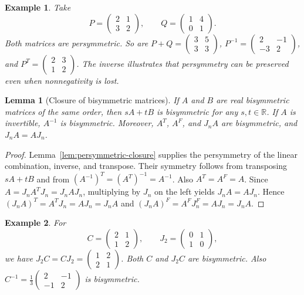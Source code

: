 \documentclass[11pt,a4paper]{article}
\newtheorem{example}{Example}
\newtheorem{lemma}{Lemma}
\begin{document}
\begin{example}
Take
\[
 P=\begin{pmatrix}2&1\\3&2\end{pmatrix},\qquad
 Q=\begin{pmatrix}1&4\\0&1\end{pmatrix}.
\]
Both matrices are persymmetric. So are
$P+Q=\left(\begin{smallmatrix}3&5\\3&3\end{smallmatrix}\right)$,
$P^{-1}=\left(\begin{smallmatrix}2&-1\\-3&2\end{smallmatrix}\right)$,
and $P^T=\left(\begin{smallmatrix}2&3\\1&2\end{smallmatrix}\right)$.
The inverse illustrates that persymmetry can be preserved even when
nonnegativity is lost.
\end{example}

\begin{lemma}[Closure of bisymmetric matrices]\label{lem:bisymmetric-closure}
If $A$ and $B$ are real bisymmetric matrices of the same order, then
$sA+tB$ is bisymmetric for any $s,t\in\mathbb R$. If $A$ is invertible,
$A^{-1}$ is bisymmetric. Moreover, $A^T$, $A^F$, and $J_nA$ are
bisymmetric, and $J_nA=AJ_n$.
\end{lemma}
\begin{proof}
Lemma~\ref{lem:persymmetric-closure} supplies the persymmetry of the
linear combination, inverse, and transpose. Their symmetry follows from
transposing $sA+tB$ and from $(A^{-1})^T=(A^T)^{-1}=A^{-1}$.
Also $A^T=A^F=A$. Since $A=J_nA^TJ_n=J_nAJ_n$, multiplying by $J_n$
on the left yields $J_nA=AJ_n$. Hence
$(J_nA)^T=A^TJ_n=AJ_n=J_nA$ and
$(J_nA)^F=A^FJ_n^F=AJ_n=J_nA$.
\end{proof}

\begin{example}
For
\[
 C=\begin{pmatrix}2&1\\1&2\end{pmatrix},\qquad
 J_2=\begin{pmatrix}0&1\\1&0\end{pmatrix},
\]
we have
$J_2C=CJ_2=\left(\begin{smallmatrix}1&2\\2&1\end{smallmatrix}\right)$.
Both $C$ and $J_2C$ are bisymmetric. Also
$C^{-1}=\frac13\left(\begin{smallmatrix}2&-1\\-1&2\end{smallmatrix}\right)$
is bisymmetric.
\end{example}
\end{document}
